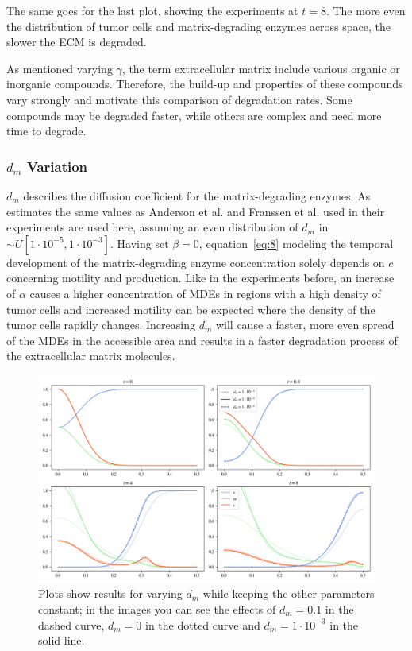 The same goes for the last plot, showing the experiments at $t=8$. The more even the distribution of tumor cells and matrix-degrading enzymes across space, the slower the ECM is degraded.

As mentioned varying $\gamma$, the term extracellular matrix include various organic or inorganic compounds. Therefore, the build-up and properties of these compounds vary strongly and motivate this comparison of degradation rates. Some compounds may be degraded faster, while others are complex and need more time to degrade. 

\subsubsection*{$d_m$ Variation}
$d_m$ describes the diffusion coefficient for the matrix-degrading enzymes. As estimates the same values as Anderson et al. and Franssen et al. used in their experiments are used here, assuming an even distribution of $d_m$ in $\sim U[1\cdot 10^{-5},1\cdot 10^{-3}]$. Having set $\beta=0$, equation~\ref{eq:8} modeling the temporal development of the matrix-degrading enzyme concentration solely depends on $c$ concerning motility and production. Like in the experiments before, an increase of $\alpha$ causes a higher concentration of MDEs in regions with a high density of tumor cells and increased motility can be expected where the density of the tumor cells rapidly changes. Increasing $d_m$ will cause a faster, more even spread of the MDEs in the accessible area and results in a faster degradation process of the extracellular matrix molecules.
\begin{figure}[h]
 \centering
 \includegraphics[width=\textwidth]{resources/images/dm_variation.png}
 \caption{Plots show results for varying $d_m$ while keeping the other parameters constant; in the images you can see the effects of $d_m=0.1$ in the dashed curve, $d_m=0$ in the dotted curve and $d_m=1\cdot 10^{-3}$ in the solid line.}
 \label{fig:dm_variation}
\end{figure}
